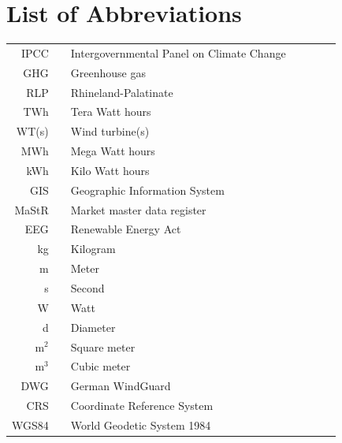 \documentclass[a4paper,11pt]{article}
\begin{document}
\newpage
\hypertarget{list-of-abbreviations}{%
\section*{List of Abbreviations}\label{list-of-abbreviations}}
\begin{tabular}{rp{0.2cm}lp{1cm}rp{0.2cm}l}
    IPCC    & &  Intergovernmental Panel on Climate Change \\
    GHG & & Greenhouse gas \\  
    RLP     & &  Rhineland-Palatinate \\
    TWh     & &  Tera Watt hours  \\
    WT(s)      & &  Wind turbine(s)  \\
    MWh     & &  Mega Watt hours \\
    kWh     & &  Kilo Watt hours \\
    GIS     & &  Geographic Information System \\
    MaStR   & &  Market master data register \\
    EEG     & &  Renewable Energy Act \\
    kg      & &  Kilogram \\
    m       & &  Meter \\
    s       & &  Second \\
    W       & &  Watt \\
    d       & &  Diameter \\
    m$^2$   & &  Square meter \\
    m$^3$   & &  Cubic meter \\
    DWG     & &  German WindGuard \\
    CRS     & &  Coordinate Reference System \\
    WGS84   & &  World Geodetic System 1984 \\ 
    
\end{tabular}
\newpage
\listoffigures
{}

\newpage
\listoftables
{}
\end{document}

